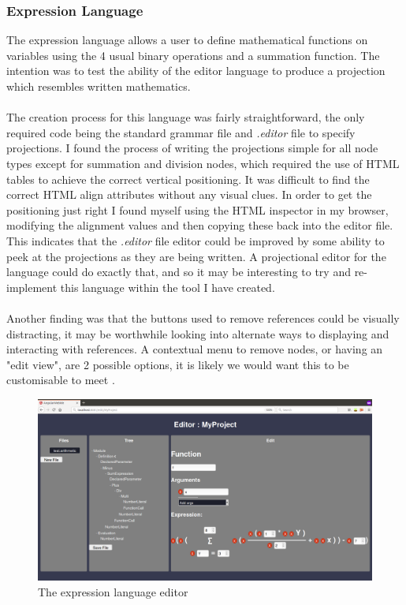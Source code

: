 \documentclass{article}
\begin{document}
{\subsubsection{Expression Language}
The expression language allows a user to define mathematical functions on variables using the 4 usual binary operations and a summation function. The intention was to test the ability of the editor language to produce a projection which resembles written mathematics.
\\
\\
The creation process for this language was fairly straightforward, the only required code being the standard grammar file and \emph{.editor} file to specify projections. I found the process of writing the projections simple for all node types except for summation and division nodes, which required the use of HTML tables to achieve the correct vertical positioning. It was difficult to find the correct HTML align attributes without any visual clues. In order to get the positioning just right I found myself using the HTML inspector in my browser, modifying the alignment values and then copying these back into the editor file. This indicates that the \emph{.editor} file editor could be improved by some ability to peek at the projections as they are being written. A projectional editor for the language could do exactly that, and so it may be interesting to try and re-implement this language within the tool I have created.   
\\
\\
Another finding was that the buttons used to remove references could be visually distracting, it may be worthwhile looking into alternate ways to displaying and interacting with references. A contextual menu to remove nodes, or having an "edit view", are 2 possible options, it is likely we would want this to be customisable to meet \RCustom.
\begin{figure}[h!]
  \centering
  \includegraphics[width=\linewidth]{./Screenshots/arithmeticUI2.png}
  \caption{The expression language editor}
  \label{fig:arithmeticUI}
\end{figure}


}
\end{document}

